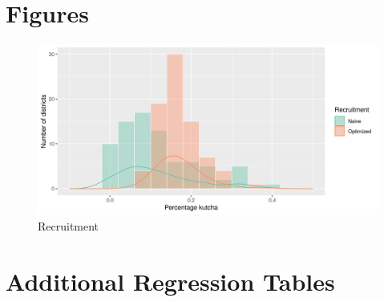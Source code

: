 \documentclass[a4paper,12pt]{article}
\begin{document}
\clearpage
\appendix

\section{Figures}

\begin{figure}[h]
	\centering
	\includegraphics[width=\linewidth]{figures/recruitment}
	\caption{Recruitment}
    \label{fig:recruitment}
\end{figure}

\clearpage
\section{Additional Regression Tables}








\end{document}
